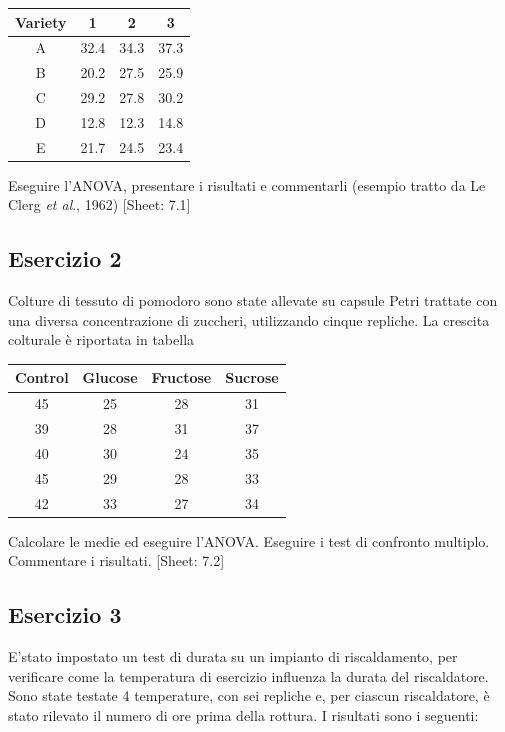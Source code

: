 \documentclass[a4paper,12pt,oneside]{book}
\begin{document}
\begin{longtable}[]{@{}cccc@{}}
\toprule()
Variety & 1 & 2 & 3 \\
\midrule()
\endhead
A & 32.4 & 34.3 & 37.3 \\
B & 20.2 & 27.5 & 25.9 \\
C & 29.2 & 27.8 & 30.2 \\
D & 12.8 & 12.3 & 14.8 \\
E & 21.7 & 24.5 & 23.4 \\
\bottomrule()
\end{longtable}

Eseguire l'ANOVA, presentare i risultati e commentarli (esempio tratto da Le Clerg \emph{et al}., 1962)
{[}Sheet: 7.1{]}

\hypertarget{esercizio-2-5}{%
\subsection{Esercizio 2}\label{esercizio-2-5}}

Colture di tessuto di pomodoro sono state allevate su capsule Petri trattate con una diversa concentrazione di zuccheri, utilizzando cinque repliche. La crescita colturale è riportata in tabella

\begin{longtable}[]{@{}cccc@{}}
\toprule()
Control & Glucose & Fructose & Sucrose \\
\midrule()
\endhead
45 & 25 & 28 & 31 \\
39 & 28 & 31 & 37 \\
40 & 30 & 24 & 35 \\
45 & 29 & 28 & 33 \\
42 & 33 & 27 & 34 \\
\bottomrule()
\end{longtable}

Calcolare le medie ed eseguire l'ANOVA. Eseguire i test di confronto multiplo. Commentare i risultati.
{[}Sheet: 7.2{]}

\hypertarget{esercizio-3-5}{%
\subsection{Esercizio 3}\label{esercizio-3-5}}

E'stato impostato un test di durata su un impianto di riscaldamento, per verificare come la temperatura di esercizio influenza la durata del riscaldatore. Sono state testate 4 temperature, con sei repliche e, per ciascun riscaldatore, è stato rilevato il numero di ore prima della rottura. I risultati sono i seguenti:
\end{document}

